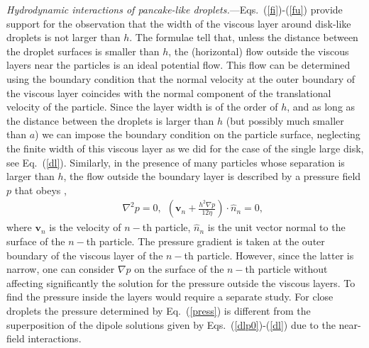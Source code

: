 {\it Hydrodynamic interactions of pancake-like droplets.}---Eqs.~(\ref{fi})-(\ref{fu}) provide support for the observation that  the width of the viscous layer around disk-like droplets is not larger than $h$.
The formulae tell that, unless the distance between the droplet surfaces is smaller than $h$, the (horizontal) flow outside the viscous layers near the particles is an
ideal potential flow. This flow can be determined using the boundary condition that the normal velocity at the outer boundary of the viscous layer coincides with the normal component of the translational velocity of the particle.
Since the layer width is of the order of $h$, and as long as the distance between the droplets is larger than $h$ (but possibly much smaller than $a$) we can impose the boundary condition on the particle surface, neglecting the finite width of this viscous layer as we did for the case of the single large disk, see Eq.~(\ref{dl}). Similarly, in the presence of many particles whose separation is larger than $h$, the flow outside the boundary layer is described by a pressure field $p$ that obeys \cite{is,tl2012},
\begin{eqnarray}&&%
\nabla^2 p=0,\ \ \left(\bm v_n+\frac{h^2\nabla p}{12\eta}\right)\cdot{\hat n}_n=0, \label{press}
\end{eqnarray}
where $\bm v_n$ is the velocity of $n-$th particle, ${\hat n}_n$ is the unit vector normal to the surface of the $n-$th particle. The pressure gradient is taken at the outer boundary of the viscous layer of the $n-$th particle. However, since the latter is narrow, one can consider $\nabla p$ on the surface of the $n-$th particle without affecting significantly the solution for the pressure outside the viscous layers. To find the pressure inside the layers would require a separate study. For close droplets the pressure determined by Eq.~(\ref{press}) is different from the superposition of the dipole solutions given by Eqs.~(\ref{dlp0})-(\ref{dl}) due to the near-field interactions.

